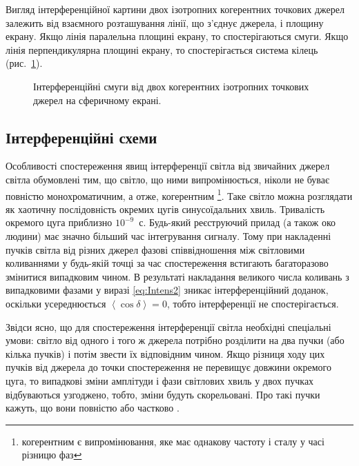 Вигляд інтерференційної картини двох ізотропних когерентних точкових джерел залежить від взаємного розташування лінії, що з'єднує джерела, і площину екрану. Якщо лінія паралельна площині екрану, то спостерігаються смуги. Якщо лінія перпендикулярна площині екрану, то спостерігається система кілець (рис.~\ref{pic:3D_interference}).

\begin{figure}[h!]\centering
	
	\caption{Інтерференційні смуги від двох когерентних ізотропних точкових джерел на сферичному екрані.}
	\label{pic:3D_interference}
\end{figure}



\subsection*{Інтерференційні схеми}


Особливості спостереження явищ інтерференції світла від звичайних джерел світла обумовлені тим, що світло, що ними випромінюється, ніколи не буває повністю монохроматичним, а отже, когерентним \footnote{когерентним є випромінювання, яке має однакову частоту і сталу у часі різницю фаз}. Таке світло можна розглядати як хаотичну послідовність окремих цугів синусоїдальних хвиль. Тривалість окремого цуга приблизно $10^{-9}$~с. Будь-який реєструючий прилад (а також око людини) має значно більший час інтегрування сигналу. Тому при накладенні пучків світла від різних джерел фазові співвідношення між світловими коливаннями у будь-якій точці за час спостереження встигають багаторазово змінитися випадковим чином. В результаті накладання великого числа коливань з випадковими фазами у виразі \eqref{eq:Intens2} зникає інтерференційний доданок, оскільки усереднюється $\left\langle \cos\delta \right\rangle = 0$, тобто інтерференції не спостерігається.

Звідси ясно, що для спостереження інтерференції світла необхідні спеціальні умови: світло від одного і того ж джерела потрібно розділити на два пучки (або кілька пучків) і потім звести їх відповідним чином. Якщо різниця ходу цих пучків від джерела до точки спостереження не перевищує довжини окремого цуга, то випадкові зміни амплітуди і фази світлових хвиль у двох пучках відбуваються узгоджено, тобто, зміни будуть скорельовані. Про такі пучки кажуть, що вони повністю або частково .

